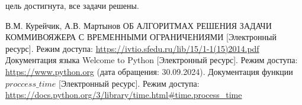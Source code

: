 \documentclass{bmstu}
\begin{document}
 цель достигнута, все задачи решены.

\vspace{5mm}

\renewcommand{\bibname}{СПИСОК ИСПОЛЬЗОВАННЫХ ИСТОЧНИКОВ}
\begin{thebibliography}{5}
	В.М. Курейчик, А.В. Мартынов
ОБ АЛГОРИТМАХ РЕШЕНИЯ ЗАДАЧИ КОММИВОЯЖЕРА С
ВРЕМЕННЫМИ ОГРАНИЧЕНИЯМИ [Электронный ресурс]. Режим доступа: \url{https://ivtio.sfedu.ru/lib/15/1-1(15)2014.pdf}
	Документация языка Welcome to Python [Электронный ресурс]. Режим доступа: \url{https://www.python.org} (дата обращения: 30.09.2024).
        Документация функции $proccess\_time$ [Электронный ресурс]. Режим доступа: \url{https://docs.python.org/3/library/time.html#time.process_time}
\end{thebibliography}

\end{document}
